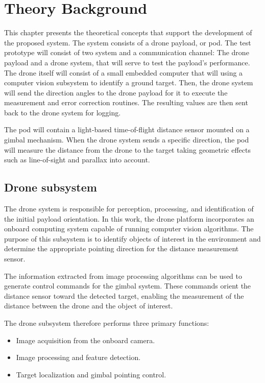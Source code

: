 \chapter{Theory Background}
\label{cap:back}

This chapter presents the theoretical concepts that support the development of the proposed
system. The system consists of a drone payload, or pod. The test prototype will consist of
two system and a communication channel: The drone payload and a drone system, that will serve
to test the payload's performance. The drone itself will consist of a small embedded computer
that will using a computer vision subsystem to identify a ground target. Then, the drone
system will send the direction angles to the drone payload for it to execute the measurement
and error correction routines. The resulting values are then sent back to the drone system
for logging.

The pod will contain a light-based time-of-flight distance sensor mounted on a gimbal mechanism.
When the drone system sends a specific direction, the pod will measure the distance from the
drone to the target taking  geometric effects such as line-of-sight and parallax into account.

\section{Drone subsystem}

The drone system is responsible for perception, processing, and identification of the initial
payload orientation. In this work, the drone platform incorporates an onboard computing system
capable of running computer vision algorithms. The purpose of this subsystem is to identify
objects of interest in the environment and determine the appropriate pointing direction for
the distance measurement sensor.

The information extracted from image processing algorithms can be used to generate control
commands for the gimbal system. These commands orient the distance sensor toward the
detected target, enabling the measurement of the distance between the drone and the object
of interest.

The drone subsystem therefore performs three primary functions:

\begin{itemize}
  \item Image acquisition from the onboard camera.
  \item Image processing and feature detection.
  \item Target localization and gimbal pointing control.
\end{itemize}

